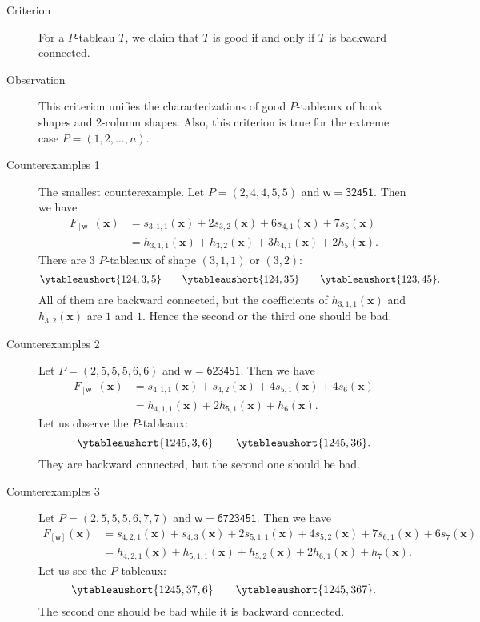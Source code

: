 \documentclass[11pt,reqno]{amsart}
\theoremstyle{definition}
\theoremstyle{remark}
\numberwithin{equation}{section}
\newcommand\xx{\mathbf{x}}
\newcommand\ww{\mathsf{w}}
\begin{document}
\begin{description}
  \item[Criterion] For a \( P \)-tableau \( T \), we claim that \( T \) is good if and only if
  \( T \) is backward connected.
  \item[Observation] This criterion unifies the characterizations of good \( P \)-tableaux of
  hook shapes and 2-column shapes. Also, this criterion is true for the extreme case \( P=(1,2,\dots,n) \).
  \item[Counterexamples 1] The smallest counterexample.
  Let \( P=(2,4,4,5,5) \) and \( \ww=\mathsf{32451} \). Then we have
  \begin{align*}
    F_{[\ww]}(\xx)
      &= s_{3,1,1}(\xx) + 2 s_{3,2}(\xx) + 6 s_{4,1}(\xx) + 7 s_{5}(\xx) \\
      &= h_{3,1,1}(\xx) + h_{3,2}(\xx) + 3 h_{4,1}(\xx) + 2 h_{5}(\xx).
  \end{align*}
  There are 3 \( P \)-tableaux of shape \( (3,1,1) \) or \( (3,2) \):
  \[
    \ytableaushort{124,3,5} \qquad \ytableaushort{124,35} \qquad \ytableaushort{123,45}.
  \]
  All of them are backward connected, but the coefficients of \( h_{3,1,1}(\xx) \) and \( h_{3,2}(\xx)
  \) are \( 1 \) and \( 1 \). Hence the second or the third one should be bad.
  \item[Counterexamples 2] Let \( P=(2,5,5,5,6,6) \) and \( \ww=\mathsf{623451} \).
  Then we have
  \begin{align*}
    F_{[\ww]}(\xx)
      &= s_{4,1,1}(\xx) + s_{4,2}(\xx) + 4 s_{5,1}(\xx) + 4 s_{6}(\xx) \\
      &= h_{4,1,1}(\xx) + 2 h_{5,1}(\xx) + h_{6}(\xx).
  \end{align*}
  Let us observe the \( P \)-tableaux:
  \[
    \ytableaushort{1245,3,6} \qquad \ytableaushort{1245,36}.
  \]
  They are backward connected, but the second one should be bad.
  \item[Counterexamples 3] Let \( P=(2, 5, 5, 5, 6, 7, 7) \) and \( \ww=\mathsf{6723451} \).
  Then we have
  \begin{align*}
    F_{[\ww]}(\xx)
      &= s_{4,2,1}(\xx) + s_{4,3}(\xx) + 2 s_{5,1,1}(\xx) + 4 s_{5,2}(\xx) + 7 s_{6,1}(\xx) + 6 s_{7}(\xx) \\
      &= h_{4,2,1}(\xx) + h_{5,1,1}(\xx) + h_{5,2}(\xx) + 2 h_{6,1}(\xx) + h_{7}(\xx).
  \end{align*}
  Let us see the \( P \)-tableaux:
  \[
    \ytableaushort{1245,37,6} \qquad \ytableaushort{1245,367}.
  \]
  The second one should be bad while it is backward connected.

\end{description}
\end{document}
